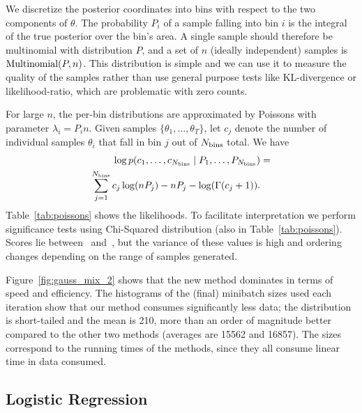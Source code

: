 \documentclass{article}
\begin{document}
We discretize the posterior coordinates into bins with respect to the two
components of $\theta$.  The probability $P_i$ of a sample falling into bin $i$
is the integral of the true posterior over the bin's area.  A single sample
should therefore be multinomial with distribution $P$, and a set of $n$ (ideally
independent) samples is ${\rm Multinomial}(P,n)$. This distribution is simple
and we can use it to measure the quality of the samples rather than use general
purpose tests like KL-divergence or likelihood-ratio, which are problematic
with zero counts.

For large $n$, the per-bin distributions are approximated by Poissons with
parameter $\lambda_i=P_i n$. Given samples $\{\theta_1,\ldots,\theta_T\}$, let
$c_j$ denote the number of individual samples $\theta_i$ that fall in bin $j$
out of $N_{\rm bins}$ total. We have
\begin{equation}\label{eq:log_prob_poissons}
\begin{split}
    \log p(c_1, \ldots, c_{N_{\rm bins}} \mid P_1, \ldots, P_{N_{\rm bins}}) & =  \\
    \sum_{j=1}^{N_{\rm bins}} c_j \log (n P_j) - n P_j - \log(\Gamma(c_j+1)). & \\
\end{split}
\end{equation}
Table~\ref{tab:poissons} shows the likelihoods. To facilitate
interpretation we perform significance tests using Chi-Squared
distribution (also in Table~\ref{tab:poissons}). Scores lie
between~\cite{cutting_mh_2014} and~\cite{icml2014c1_bardenet14}, but
the variance of these values is high and ordering changes depending on
the range of samples generated.

Figure~\ref{fig:gauss_mix_2} shows that the new method dominates in
terms of speed and efficiency. The histograms of the (final) minibatch sizes
used each iteration show that our method consumes significantly less data; the
distribution is short-tailed and the mean is 210, more than an order of
magnitude better compared to the other two methods (averages are 15562 and
16857). The sizes correspond to the running times of the methods, since
they all consume linear time in data consumed. 


\subsection{Logistic Regression}\label{ssec:logistic}
\end{document}
